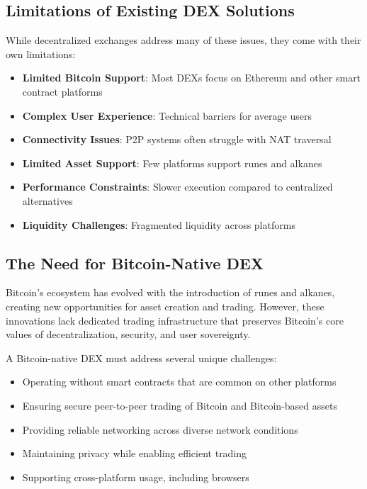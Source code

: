 \documentclass[11pt,a4paper]{article}
\begin{document}
\subsection{Limitations of Existing DEX Solutions}

While decentralized exchanges address many of these issues, they come with their own limitations:

\begin{itemize}
    \item \textbf{Limited Bitcoin Support}: Most DEXs focus on Ethereum and other smart contract platforms
    \item \textbf{Complex User Experience}: Technical barriers for average users
    \item \textbf{Connectivity Issues}: P2P systems often struggle with NAT traversal
    \item \textbf{Limited Asset Support}: Few platforms support runes and alkanes
    \item \textbf{Performance Constraints}: Slower execution compared to centralized alternatives
    \item \textbf{Liquidity Challenges}: Fragmented liquidity across platforms
\end{itemize}

\subsection{The Need for Bitcoin-Native DEX}

Bitcoin's ecosystem has evolved with the introduction of runes and alkanes, creating new opportunities for asset creation and trading. However, these innovations lack dedicated trading infrastructure that preserves Bitcoin's core values of decentralization, security, and user sovereignty.

A Bitcoin-native DEX must address several unique challenges:

\begin{itemize}
    \item Operating without smart contracts that are common on other platforms
    \item Ensuring secure peer-to-peer trading of Bitcoin and Bitcoin-based assets
    \item Providing reliable networking across diverse network conditions
    \item Maintaining privacy while enabling efficient trading
    \item Supporting cross-platform usage, including browsers
\end{itemize}
\end{document}
